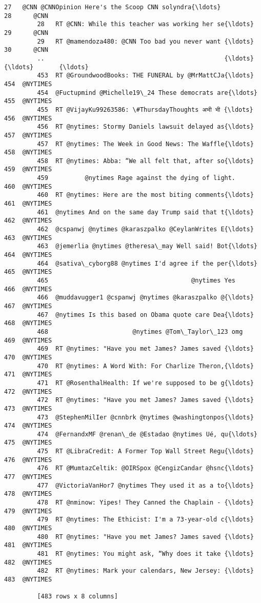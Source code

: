 \documentclass[11pt]{article}
\begin{document}
\begin{Verbatim}[commandchars=\\\{\}]
         27   @CNN @CNNOpinion Here's the Scoop CNN solyndra{\ldots}          28      @CNN  
         28   RT @CNN: While this teacher was working her se{\ldots}          29      @CNN  
         29   RT @mamendoza480: @CNN Too bad you never want {\ldots}          30      @CNN  
         ..                                                 {\ldots}         {\ldots}       {\ldots}  
         453  RT @GroundwoodBooks: THE FUNERAL by @MrMattCJa{\ldots}         454  @NYTIMES  
         454  @Fuctupmind @Michelle19\_24 These democrats are{\ldots}         455  @NYTIMES  
         455  RT @VijayKu99263586: \#ThursdayThoughts अभी भी {\ldots}         456  @NYTIMES  
         456  RT @nytimes: Stormy Daniels lawsuit delayed as{\ldots}         457  @NYTIMES  
         457  RT @nytimes: The Week in Good News: The Waffle{\ldots}         458  @NYTIMES  
         458  RT @nytimes: Abba: “We all felt that, after so{\ldots}         459  @NYTIMES  
         459          @nytimes Rage against the dying of light.         460  @NYTIMES  
         460  RT @nytimes: Here are the most biting comments{\ldots}         461  @NYTIMES  
         461  @nytimes And on the same day Trump said that t{\ldots}         462  @NYTIMES  
         462  @cspanwj @nytimes @karaszpalko @CeylanWrites E{\ldots}         463  @NYTIMES  
         463  @jemerlia @nytimes @theresa\_may Well said! Bot{\ldots}         464  @NYTIMES  
         464  @sativa\_cyborg88 @nytimes I'd agree if the per{\ldots}         465  @NYTIMES  
         465                                       @nytimes Yes         466  @NYTIMES  
         466  @muddavugger1 @cspanwj @nytimes @karaszpalko @{\ldots}         467  @NYTIMES  
         467  @nytimes Is this based on Obama quote care Dea{\ldots}         468  @NYTIMES  
         468                       @nytimes @Tom\_Taylor\_123 omg         469  @NYTIMES  
         469  RT @nytimes: "Have you met James? James saved {\ldots}         470  @NYTIMES  
         470  RT @nytimes: A Word With: For Charlize Theron,{\ldots}         471  @NYTIMES  
         471  RT @RosenthalHealth: If we're supposed to be g{\ldots}         472  @NYTIMES  
         472  RT @nytimes: "Have you met James? James saved {\ldots}         473  @NYTIMES  
         473  @StephenMilIer @cnnbrk @nytimes @washingtonpos{\ldots}         474  @NYTIMES  
         474  @FernandxMF @renan\_de @Estadao @nytimes Ué, qu{\ldots}         475  @NYTIMES  
         475  RT @LibraCredit: A Former Top Wall Street Regu{\ldots}         476  @NYTIMES  
         476  RT @MumtazCeltik: @OIRSpox @CengizCandar @hsnc{\ldots}         477  @NYTIMES  
         477  @VictoriaVanHor7 @nytimes They used it as a to{\ldots}         478  @NYTIMES  
         478  RT @nminow: Yipes! They Canned the Chaplain - {\ldots}         479  @NYTIMES  
         479  RT @nytimes: The Ethicist: I'm a 73-year-old c{\ldots}         480  @NYTIMES  
         480  RT @nytimes: "Have you met James? James saved {\ldots}         481  @NYTIMES  
         481  RT @nytimes: You might ask, “Why does it take {\ldots}         482  @NYTIMES  
         482  RT @nytimes: Mark your calendars, New Jersey: {\ldots}         483  @NYTIMES  
         
         [483 rows x 8 columns]
\end{Verbatim}
            
\end{document}
